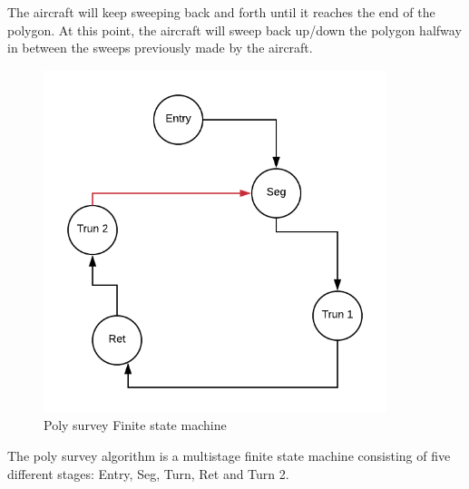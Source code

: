 The aircraft will keep sweeping back and forth until it reaches the end of the polygon. At this point, the aircraft will sweep back up/down the polygon halfway in between the sweeps previously made by the aircraft. 
\begin{figure}[H]
\centering
\includegraphics[width=10cm,height=10cm,keepaspectratio]{imagenes/FSM.png}
\caption{Poly survey Finite state machine }
\label{fig:FSM}
\end{figure}

The poly survey algorithm is a multistage finite state machine consisting of five different stages: Entry, Seg, Turn, Ret and Turn 2.
